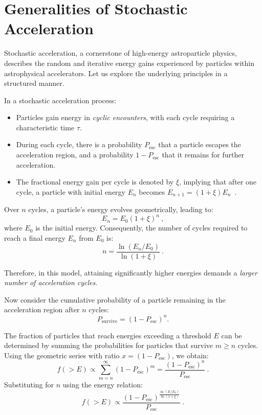 \section{Generalities of Stochastic Acceleration}

Stochastic acceleration, a cornerstone of high-energy astroparticle physics, describes the random and iterative energy gains experienced by particles within astrophysical accelerators. Let us explore the underlying principles in a structured manner.

In a stochastic acceleration process:
%
\begin{itemize}
\item Particles gain energy in \emph{cyclic encounters}, with each cycle requiring a characteristic time \( \tau \). 
\item During each cycle, there is a probability \( P_{\text{esc}} \) that a particle escapes the acceleration region, and a probability \( 1 - P_{\text{esc}} \) that it remains for further acceleration. 
\item The fractional energy gain per cycle is denoted by \( \xi \), implying that after one cycle, a particle with initial energy \( E_n \) becomes \( E_{n+1} = (1 + \xi) E_n \)~.
\end{itemize}

Over \( n \) cycles, a particle's energy evolves geometrically, leading to:
\begin{equation}
E_n = E_0 (1 + \xi)^n~,
\end{equation}
where \( E_0 \) is the initial energy. 
%
Consequently, the number of cycles required to reach a final energy \( E_n \) from \( E_0 \) is:
\begin{equation}
n = \frac{\ln \left( E_n/E_0 \right)}{\ln (1 + \xi)}~.
\end{equation}

Therefore, in this model, attaining significantly higher energies demands a \emph{larger number of acceleration cycles}.

Now consider the cumulative probability of a particle remaining in the acceleration region after \( n \) cycles:
\begin{equation}
P_{\text{survive}} = (1 - P_{\text{esc}})^n.
\end{equation}

The fraction of particles that reach energies exceeding a threshold \( E \) can be determined by summing the probabilities for particles that survive \( m \geq n \) cycles. Using the geometric series with ratio \( x = (1 - P_{\text{esc}}) \), we obtain:
\begin{equation}
f(>E) \propto \sum_{m=n}^\infty (1 - P_{\text{esc}})^m = \frac{(1-P_{\text{esc}})^n}{P_{\text{esc}}}~.
\end{equation}
Substituting for \( n \) using the energy relation:
\begin{equation}
f(>E) \propto \frac{(1-P_{\text{esc}})^{\frac{\ln \left( E/E_0 \right)}{\ln (1 + \xi)}}}{P_{\text{esc}}}~.
\end{equation}

